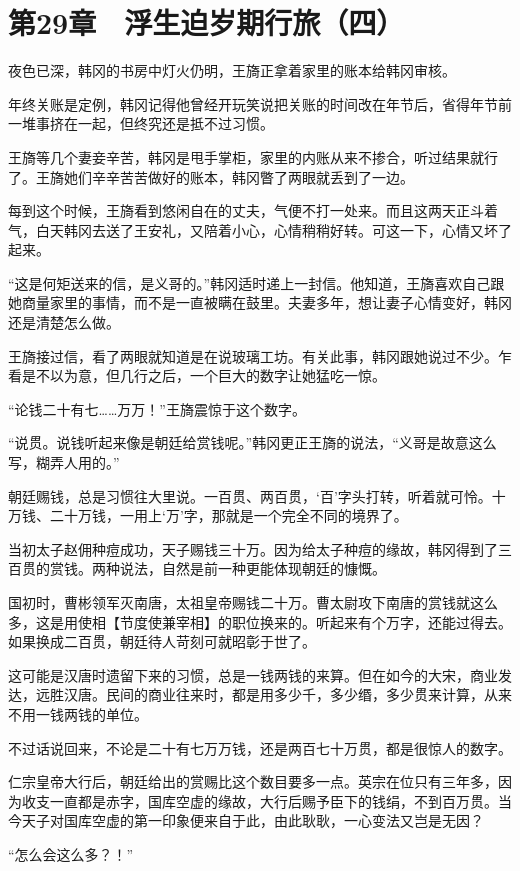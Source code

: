 \section{第29章　浮生迫岁期行旅（四）}

夜色已深，韩冈的书房中灯火仍明，王旖正拿着家里的账本给韩冈审核。

年终关账是定例，韩冈记得他曾经开玩笑说把关账的时间改在年节后，省得年节前一堆事挤在一起，但终究还是抵不过习惯。

王旖等几个妻妾辛苦，韩冈是甩手掌柜，家里的内账从来不掺合，听过结果就行了。王旖她们辛辛苦苦做好的账本，韩冈瞥了两眼就丢到了一边。

每到这个时候，王旖看到悠闲自在的丈夫，气便不打一处来。而且这两天正斗着气，白天韩冈去送了王安礼，又陪着小心，心情稍稍好转。可这一下，心情又坏了起来。

“这是何矩送来的信，是义哥的。”韩冈适时递上一封信。他知道，王旖喜欢自己跟她商量家里的事情，而不是一直被瞒在鼓里。夫妻多年，想让妻子心情变好，韩冈还是清楚怎么做。

王旖接过信，看了两眼就知道是在说玻璃工坊。有关此事，韩冈跟她说过不少。乍看是不以为意，但几行之后，一个巨大的数字让她猛吃一惊。

“论钱二十有七……万万！”王旖震惊于这个数字。

“说贯。说钱听起来像是朝廷给赏钱呢。”韩冈更正王旖的说法，“义哥是故意这么写，糊弄人用的。”

朝廷赐钱，总是习惯往大里说。一百贯、两百贯，‘百’字头打转，听着就可怜。十万钱、二十万钱，一用上‘万’字，那就是一个完全不同的境界了。

当初太子赵佣种痘成功，天子赐钱三十万。因为给太子种痘的缘故，韩冈得到了三百贯的赏钱。两种说法，自然是前一种更能体现朝廷的慷慨。

国初时，曹彬领军灭南唐，太祖皇帝赐钱二十万。曹太尉攻下南唐的赏钱就这么多，这是用使相【节度使兼宰相】的职位换来的。听起来有个万字，还能过得去。如果换成二百贯，朝廷待人苛刻可就昭彰于世了。

这可能是汉唐时遗留下来的习惯，总是一钱两钱的来算。但在如今的大宋，商业发达，远胜汉唐。民间的商业往来时，都是用多少千，多少缗，多少贯来计算，从来不用一钱两钱的单位。

不过话说回来，不论是二十有七万万钱，还是两百七十万贯，都是很惊人的数字。

仁宗皇帝大行后，朝廷给出的赏赐比这个数目要多一点。英宗在位只有三年多，因为收支一直都是赤字，国库空虚的缘故，大行后赐予臣下的钱绢，不到百万贯。当今天子对国库空虚的第一印象便来自于此，由此耿耿，一心变法又岂是无因？

“怎么会这么多？！”

